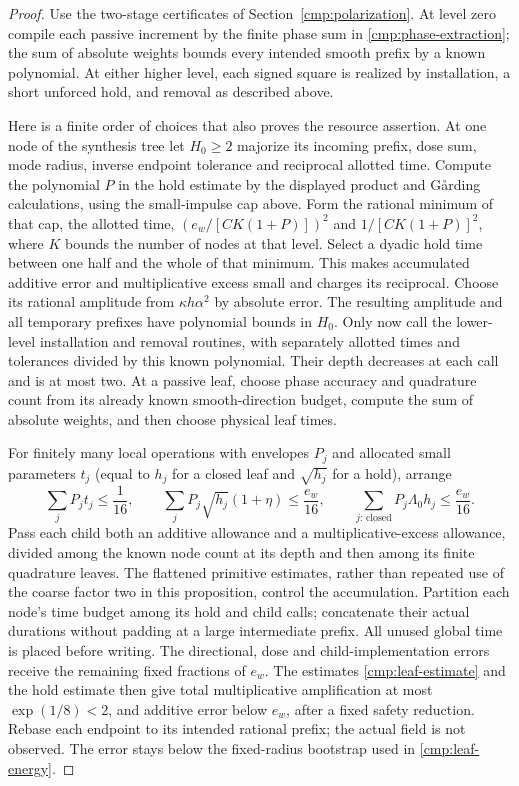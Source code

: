 \documentclass[11pt,a4paper]{amsart}
\theoremstyle{definition}
\theoremstyle{remark}
\numberwithin{equation}{section}
\begin{document}
\begin{proof}
Use the two-stage certificates of Section~\ref{cmp:polarization}. At level zero compile each passive increment by the finite phase sum in \eqref{cmp:phase-extraction}; the sum of absolute weights bounds every intended smooth prefix by a known polynomial. At either higher level, each signed square is realized by installation, a short unforced hold, and removal as described above.

Here is a finite order of choices that also proves the resource assertion. At one node of the synthesis tree let $H_0\ge2$ majorize its incoming prefix, dose sum, mode radius, inverse endpoint tolerance and reciprocal allotted time. Compute the polynomial $P$ in the hold estimate by the displayed product and G\aa rding calculations, using the small-impulse cap above. Form the rational minimum of that cap, the allotted time, $(e_w/[C K(1+P)])^2$ and $1/[C K(1+P)]^2$, where $K$ bounds the number of nodes at that level. Select a dyadic hold time between one half and the whole of that minimum. This makes accumulated additive error and multiplicative excess small and charges its reciprocal. Choose its rational amplitude from $\kappa h\alpha^2$ by absolute error. The resulting amplitude and all temporary prefixes have polynomial bounds in $H_0$. Only now call the lower-level installation and removal routines, with separately allotted times and tolerances divided by this known polynomial. Their depth decreases at each call and is at most two. At a passive leaf, choose phase accuracy and quadrature count from its already known smooth-direction budget, compute the sum of absolute weights, and then choose physical leaf times.

For finitely many local operations with envelopes $P_j$ and allocated small parameters $t_j$ (equal to $h_j$ for a closed leaf and $\sqrt{h_j}$ for a hold), arrange
\[
 \sum_j P_jt_j\le\frac1{16},\qquad
 \sum_j P_j\sqrt{h_j}(1+\eta)\le\frac{e_w}{16},\qquad
 \sum_{j:\,\text{closed}}P_j\Lambda_0h_j\le\frac{e_w}{16}.
\]
Pass each child both an additive allowance and a multiplicative-excess allowance, divided among the known node count at its depth and then among its finite quadrature leaves. The flattened primitive estimates, rather than repeated use of the coarse factor two in this proposition, control the accumulation. Partition each node's time budget among its hold and child calls; concatenate their actual durations without padding at a large intermediate prefix. All unused global time is placed before writing. The directional, dose and child-implementation errors receive the remaining fixed fractions of $e_w$. The estimates \eqref{cmp:leaf-estimate} and the hold estimate then give total multiplicative amplification at most $\exp(1/8)<2$, and additive error below $e_w$, after a fixed safety reduction. Rebase each endpoint to its intended rational prefix; the actual field is not observed. The error stays below the fixed-radius bootstrap used in \eqref{cmp:leaf-energy}.


\end{proof}
\end{document}
